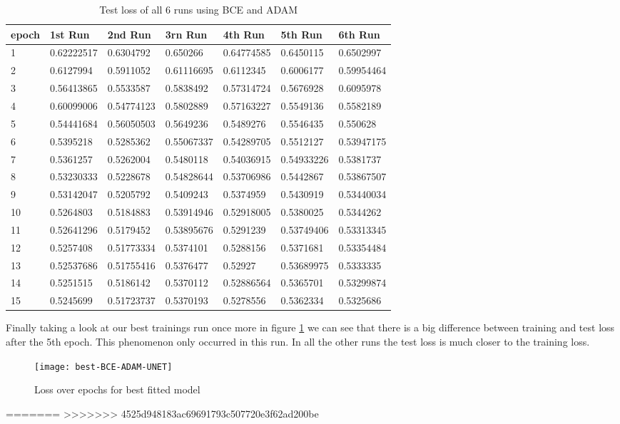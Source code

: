 \begin{table}[!ht]
    \centering
    \begin{tabular}{|l||l||l||l||l||l||l|}
    \hline
    epoch & 1st Run & 2nd Run & 3rn Run & 4th Run & 5th Run & 6th Run \\ \hline
        1 & 0.62222517 & 0.6304792 & 0.650266 & 0.64774585 & 0.6450115 & 0.6502997 \\ \hline
        2 & 0.6127994 & 0.5911052 & 0.61116695 & 0.6112345 & 0.6006177 & 0.59954464 \\ \hline
        3 & 0.56413865 & 0.5533587 & 0.5838492 & 0.57314724 & 0.5676928 & 0.6095978 \\ \hline
        4 & 0.60099006 & 0.54774123 & 0.5802889 & 0.57163227 & 0.5549136 & 0.5582189 \\ \hline
        5 & 0.54441684 & 0.56050503 & 0.5649236 & 0.5489276 & 0.5546435 & 0.550628 \\ \hline
        6 & 0.5395218 & 0.5285362 & 0.55067337 & 0.54289705 & 0.5512127 & 0.53947175 \\ \hline
        7 & 0.5361257 & 0.5262004 & 0.5480118 & 0.54036915 & 0.54933226 & 0.5381737 \\ \hline
        8 & 0.53230333 & 0.5228678 & 0.54828644 & 0.53706986 & 0.5442867 & 0.53867507 \\ \hline
        9 & 0.53142047 & 0.5205792 & 0.5409243 & 0.5374959 & 0.5430919 & 0.53440034 \\ \hline
        10 & 0.5264803 & 0.5184883 & 0.53914946 & 0.52918005 & 0.5380025 & 0.5344262 \\ \hline
        11 & 0.52641296 & 0.5179452 & 0.53895676 & 0.5291239 & 0.53749406 & 0.53313345 \\ \hline
        12 & 0.5257408 & 0.51773334 & 0.5374101 & 0.5288156 & 0.5371681 & 0.53354484 \\ \hline
        13 & 0.52537686 & 0.51755416 & 0.5376477 & 0.52927 & 0.53689975 & 0.5333335 \\ \hline
        14 & 0.5251515 & 0.5186142 & 0.5370112 & 0.52886564 & 0.5365701 & 0.53299874 \\ \hline
        15 & 0.5245699 & 0.51723737 & 0.5370193 & 0.5278556 & 0.5362334 & 0.5325686 \\ \hline
    \end{tabular}
    \caption{\label{tab:bce_adam_test}Test loss of all 6 runs using BCE and ADAM}
\end{table}


Finally taking a look at our best trainings run once more in figure \ref{im:best-BCE-ADAM-UNET} we can see that
there is a big difference between training and test loss after the 5th epoch. This phenomenon only occurred in this
run. In all the other runs the test loss is much closer to the training loss.


\begin{figure}[h]
    \texttt{[image: best-BCE-ADAM-UNET]}
    \caption{\label{im:best-BCE-ADAM-UNET} Loss over epochs for best fitted model}
\end{figure}

\newpage
=======
>>>>>>> 4525d948183ac69691793c507720e3f62ad200be
